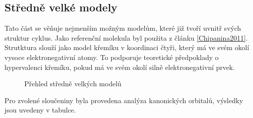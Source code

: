 \documentclass[
  digital, %
  table,   %
  lof,     %
  lot,     %
  oneside,
]{fithesis3}
\begin{document}
\subsection{Středně velké modely}
Tato část se věňuje nejmenším možným modelům, které již tvoří uvnitř svých struktur cyklus. Jako referenční molekula byl použita  z článku \ref{Chipanina2011}. Strutktura  slouží jako model křemíku v koordinaci čtyři, který má ve svém okolí vysoce elektronegativní atomy. To podporuje teoretické předpoklady o hypervalenci křemíku, pokud má ve svém okolí silně elektronegativní prvek.
\begin{figure}
\begin{center}
\caption{Přehled středně velkých modelů}
\label{prehled_middle}
\end{center}
\end{figure}
Pro zvolené sloučeniny byla provedena analýza kanonických orbitalů, výsledky jsou uvedeny v tabulce.
\end{document}
